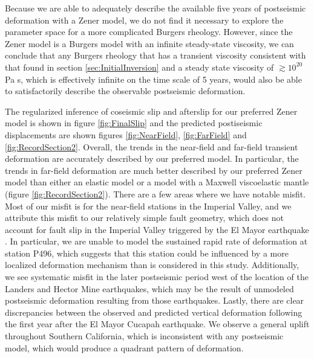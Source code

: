 \documentclass[1p]{elsarticle}
\begin{document}
Because we are able to adequately describe the available five years of postseismic deformation with a Zener model, we do not find it necessary to explore the parameter space for a more complicated Burgers rheology.  However, since the Zener model is a Burgers model with an infinite steady-state viscosity, we can conclude that any Burgers rheology that has a transient viscosity consistent with that found in section \ref{sec:InitialInversion} and a steady state viscosity of $\gtrsim10^{20}$ Pa s, which is effectively infinite on the time scale of 5 years, would also be able to satisfactorily describe the observable postseismic deformation.        
  
The regularized inference of coseismic slip and afterslip for our preferred Zener model is shown in figure \ref{fig:FinalSlip} and the predicted postiseismic displacements are shown figures \ref{fig:NearField}, \ref{fig:FarField} and \ref{fig:RecordSection2}.  Overall, the trends in the near-field and far-field transient deformation are accurately described by our preferred model.  In particular, the trends in far-field deformation are much better described by our preferred Zener model than either an elastic model or a model with a Maxwell viscoelastic mantle (figure \ref{fig:RecordSection2}).  There are a few areas where we have notable misfit.  Most of our misfit is for the near-field stations in the Imperial Valley, and we attribute this misfit to our relatively simple fault geometry, which does not account for fault slip in the Imperial Valley triggered by the El Mayor earthquake \citep{Wei2011a,Wei2015}. In particular, we are unable to model the sustained rapid rate of deformation at station P496, which suggests that this station could be influenced by a more localized deformation mechanism than is considered in this study.
Additionally, we see systematic misfit in the later postseismic period west of the location of the Landers and Hector Mine earthquakes, which may be the result of unmodeled postseismic deformation resulting from those earthquakes.  Lastly, there are clear discrepancies between the observed and predicted vertical deformation following the first year after the El Mayor Cucapah earthquake. We observe a general uplift throughout Southern California, which is inconsistent with any postseismic model, which would produce a quadrant pattern of deformation.
\end{document}
